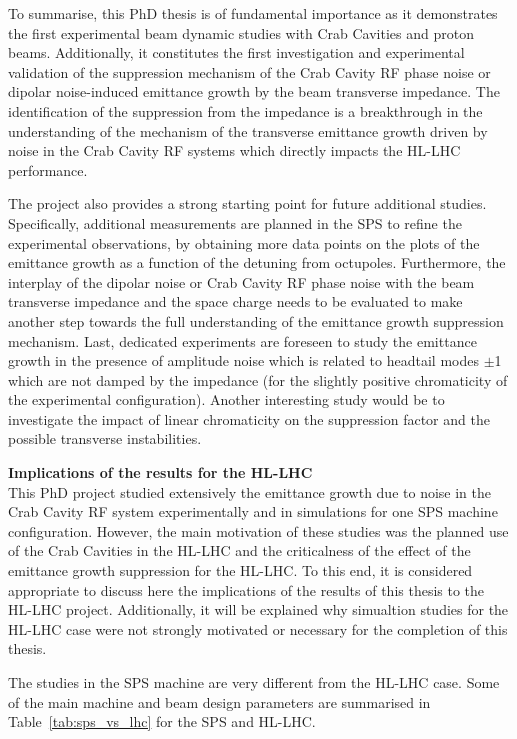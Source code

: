 To summarise, this PhD thesis is of fundamental importance as it demonstrates the first experimental beam dynamic studies with Crab Cavities and proton beams. Additionally, it constitutes the first investigation and experimental validation of the suppression mechanism of the Crab Cavity RF phase noise or dipolar noise-induced emittance growth by the beam transverse impedance. The identification of the suppression from the impedance is a breakthrough in the understanding of the mechanism of the transverse emittance growth driven by noise in the Crab Cavity RF systems which directly impacts the HL-LHC performance.

The project also provides a strong starting point for future additional studies.
Specifically, additional measurements are planned in the SPS to refine the experimental observations, by obtaining more data points on the plots of the emittance growth as a function of the detuning from octupoles. Furthermore, the interplay of the dipolar noise or Crab Cavity RF phase noise with the beam transverse impedance and the space charge needs to be evaluated to make another step towards the full understanding of the emittance growth suppression mechanism. Last, dedicated experiments are foreseen to study the emittance growth in the presence of amplitude noise which is related to headtail modes $\pm$1 which are not damped by the impedance (for the slightly positive chromaticity of the experimental configuration). Another interesting study would be to investigate the impact of linear chromaticity on the suppression factor and the possible transverse instabilities.

\textbf{Implications of the results for the HL-LHC}\\
This PhD project studied extensively the emittance growth due to noise in the Crab Cavity RF system experimentally and in simulations for one SPS machine configuration. However, the main motivation of these studies was the planned use of the Crab Cavities in the HL-LHC and the criticalness of the effect of the emittance growth suppression for the HL-LHC. To this end, it is considered appropriate to discuss here the implications of the results of this thesis to the HL-LHC project. Additionally, it will be explained why simualtion studies for the HL-LHC case were not strongly motivated or necessary for the completion of this thesis.

The studies in the SPS machine are very different from the HL-LHC case. Some of the main machine and beam design parameters are summarised in Table~\ref{tab:sps_vs_lhc} for the SPS and HL-LHC.

